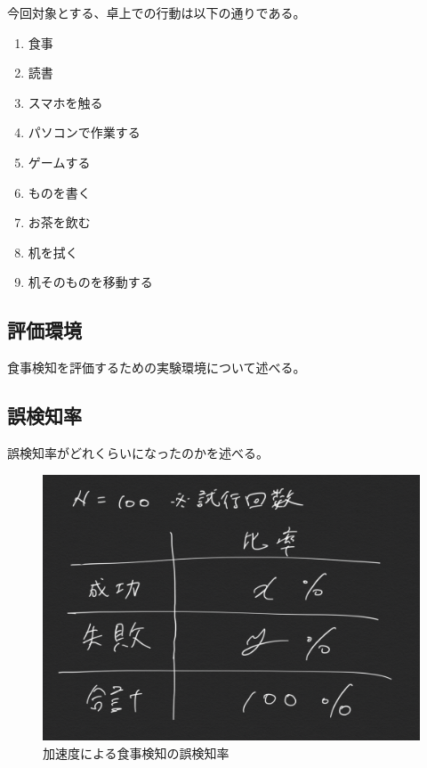 今回対象とする、卓上での行動は以下の通りである。

\begin{enumerate}
  \item 食事
  \item 読書
  \item スマホを触る
  \item パソコンで作業する
  \item ゲームする
  \item ものを書く
  \item お茶を飲む
  \item 机を拭く
  \item 机そのものを移動する
\end{enumerate}

\subsection{評価環境}
食事検知を評価するための実験環境について述べる。

\subsection{誤検知率}
誤検知率がどれくらいになったのかを述べる。

\begin{figure}[htbp]
  \caption{加速度による食事検知の誤検知率}
  \label{fig:success_failure_rate_meal}
  \begin{center}
    \includegraphics[bb=0 0 1000 450,width=20cm]{assets/success_failure_rate.png}
  \end{center}
\end{figure}

